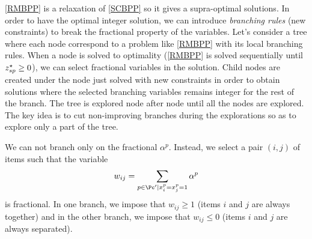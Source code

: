 \eqref{RMBPP} is a relaxation of \eqref{SCBPP} so it gives a supra-optimal solutions. In order to have the optimal integer solution, we can introduce \textit{branching rules} (new constraints) to break the fractional property of the variables. Let's consider a tree where each node correspond to a problem like \eqref{RMBPP} with its local branching rules. When a node is solved to optimality (\ie \eqref{RMBPP} is solved sequentially until ${z}^{\star}_{sp} \geq 0$), we can select fractional variables in the solution. Child nodes are created under the node just solved with new constraints in order to obtain solutions where the selected branching variables remains integer for the rest of the branch. The tree is explored node after node until all the nodes are explored. The key idea is  to cut non-improving branches during the explorations so as to explore only a part of the tree.

We can not branch only on the fractional $\alpha^p$. Instead, we select a pair $(i,j)$ of items such that the variable
\begin{equation*}
	w_{ij} = \sum_{p \in \Pc' | x_i^p=x_j^p=1} \alpha^p
\end{equation*}
is fractional. In one branch, we impose that $w_{ij} \geq 1$ (items $i$ and $j$ are always together) and in the other branch, we impose that $w_{ij} \leq 0$ (items $i$ and $j$ are always separated).
